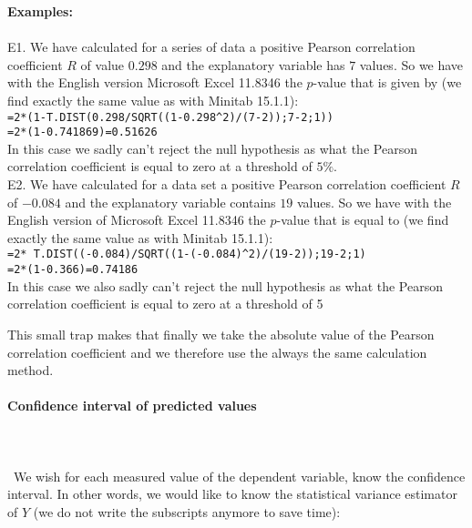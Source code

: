 	\begin{tcolorbox}[colframe=black,colback=white,sharp corners]
	\textbf{{\Large {}}Examples:}\\\\
	E1. We have calculated for a series of data a positive Pearson correlation coefficient $R$ of value $0.298$ and the explanatory variable has $7$ values. So we have with the English version Microsoft Excel 11.8346 the $p$-value that is given by (we find exactly the same value as with Minitab 15.1.1):\\
	
	\texttt{=2*(1-T.DIST(0.298/SQRT((1-0.298\string^2)/(7-2));7-2;1))\\=2*(1-0.741869)=0.51626}\\
	
	In this case we sadly can't reject the null hypothesis as what the Pearson correlation coefficient is equal to zero at a threshold of $5\%$.\\

	E2. We have calculated for a data set a positive Pearson correlation coefficient $R$ of  $-0.084$ and the explanatory variable contains $19$ values. So we have with the English version of Microsoft Excel 11.8346 the $p$-value that is equal to (we find exactly the same value as with Minitab 15.1.1):\\
	
	\texttt{=2* T.DIST((-0.084)/SQRT((1-(-0.084)\string^2)/(19-2));19-2;1)\\=2*(1-0.366)=0.74186}\\
	
	In this case we also sadly can't reject the null hypothesis as what the Pearson correlation coefficient is equal to zero at a threshold of 5%
	\end{tcolorbox}
	This small trap makes that finally we take the absolute value of the Pearson correlation coefficient and we therefore use the always the same calculation method.
	
	\paragraph{Confidence interval of predicted values}\mbox{}\\\\\
	We wish for each measured value of the dependent variable, know the confidence interval. In other words, we would like to know the statistical variance estimator of $Y$ (we do not write the subscripts anymore to save time):
	
